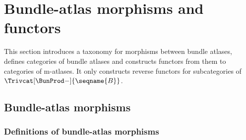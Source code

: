 \documentclass{article}
\begin{document}
\section{Bundle-atlas morphisms and functors}
\label{sec:bunatlmorph}
This section introduces a taxonomy for morphisms between bundle atlases,
defines categories of bundle atlases and constructs functors from them
to categories of m-atlases.  It only constructs reverse functors for
subcategories of $\Trivcat[\BunProd-]{\seqname{B}}$.

\subsection{Bundle-atlas morphisms}
\subsubsection{Definitions of bundle-atlas morphisms}
\end{document}
